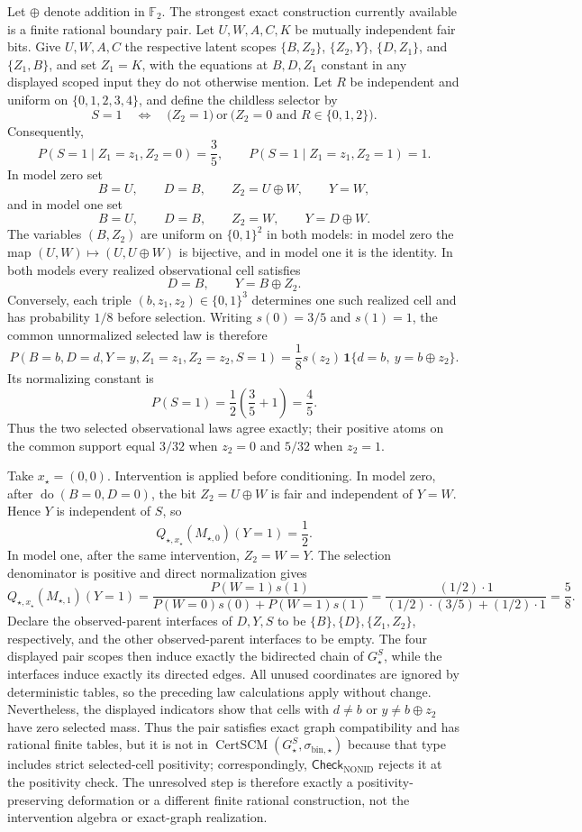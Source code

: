 Let \(\oplus\) denote addition in \(\mathbb F_2\).  The strongest exact construction currently available is a finite rational boundary pair.  Let \(U,W,A,C,K\) be mutually independent fair bits.  Give \(U,W,A,C\) the respective latent scopes \(\{B,Z_2\}\), \(\{Z_2,Y\}\), \(\{D,Z_1\}\), and \(\{Z_1,B\}\), and set \(Z_1=K\), with the equations at \(B,D,Z_1\) constant in any displayed scoped input they do not otherwise mention.  Let \(R\) be independent and uniform on \(\{0,1,2,3,4\}\), and define the childless selector by
\[
 S=1\quad\Longleftrightarrow\quad
 \bigl(Z_2=1\bigr)\ \text{or}\ \bigl(Z_2=0\text{ and }R\in\{0,1,2\}\bigr).
\]
Consequently,
\[
 P(S=1\mid Z_1=z_1,Z_2=0)=\frac35,
 \qquad
 P(S=1\mid Z_1=z_1,Z_2=1)=1.
\]
In model zero set
\[
 B=U,\qquad D=B,\qquad Z_2=U\oplus W,\qquad Y=W,
\]
and in model one set
\[
 B=U,\qquad D=B,\qquad Z_2=W,\qquad Y=D\oplus W.
\]
The variables \((B,Z_2)\) are uniform on \(\{0,1\}^2\) in both models: in model zero the map \((U,W)\mapsto(U,U\oplus W)\) is bijective, and in model one it is the identity.  In both models every realized observational cell satisfies
\[
 D=B,\qquad Y=B\oplus Z_2.
\]
Conversely, each triple \((b,z_1,z_2)\in\{0,1\}^3\) determines one such realized cell and has probability \(1/8\) before selection.  Writing \(s(0)=3/5\) and \(s(1)=1\), the common unnormalized selected law is therefore
\[
 P(B=b,D=d,Y=y,Z_1=z_1,Z_2=z_2,S=1)
 =\frac18s(z_2)\,\mathbf 1\{d=b,\ y=b\oplus z_2\}.
\]
Its normalizing constant is
\[
 P(S=1)=\frac12\left(\frac35+1\right)=\frac45.
\]
Thus the two selected observational laws agree exactly; their positive atoms on the common support equal \(3/32\) when \(z_2=0\) and \(5/32\) when \(z_2=1\).

Take \(x_\star=(0,0)\).  Intervention is applied before conditioning.  In model zero, after \(\operatorname{do}(B=0,D=0)\), the bit \(Z_2=U\oplus W\) is fair and independent of \(Y=W\).  Hence \(Y\) is independent of \(S\), so
\[
 Q_{\star,x_\star}(M_{\star,0})(Y=1)=\frac12.
\]
In model one, after the same intervention, \(Z_2=W=Y\).  The selection denominator is positive and direct normalization gives
\[
 Q_{\star,x_\star}(M_{\star,1})(Y=1)
 =\frac{P(W=1)s(1)}{P(W=0)s(0)+P(W=1)s(1)}
 =\frac{(1/2)\cdot1}{(1/2)\cdot(3/5)+(1/2)\cdot1}
 =\frac58.
\]
Declare the observed-parent interfaces of \(D,Y,S\) to be \(\{B\},\{D\},\{Z_1,Z_2\}\), respectively, and the other observed-parent interfaces to be empty.  The four displayed pair scopes then induce exactly the bidirected chain of \(G_\star^S\), while the interfaces induce exactly its directed edges.  All unused coordinates are ignored by deterministic tables, so the preceding law calculations apply without change.  Nevertheless, the displayed indicators show that cells with \(d\ne b\) or \(y\ne b\oplus z_2\) have zero selected mass.  Thus the pair satisfies exact graph compatibility and has rational finite tables, but it is not in \(\operatorname{CertSCM}(G_\star^S,\sigma_{\mathrm{bin},\star})\) because that type includes strict selected-cell positivity; correspondingly, \(\mathsf{Check}_{\mathrm{NONID}}\) rejects it at the positivity check.  The unresolved step is therefore exactly a positivity-preserving deformation or a different finite rational construction, not the intervention algebra or exact-graph realization.